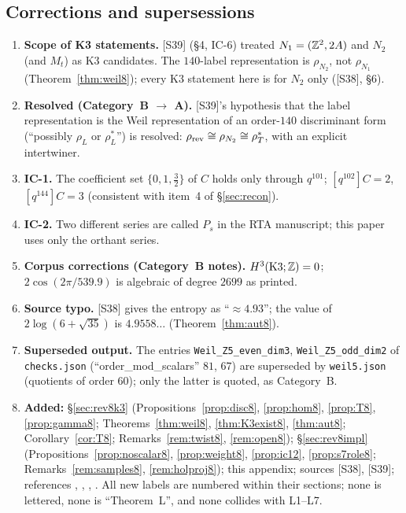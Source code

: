 \subsection{Corrections and supersessions}
\begin{enumerate}[label={R8.\arabic*},leftmargin=3em]
\item \textbf{Scope of K3 statements.} [S39] (\S4, IC-6) treated $N_1=(\mathbb{Z}^2,2A)$ and $N_2$ (and $M_t$) as K3 candidates. The $140$-label representation is $\rho_{N_2}$, not $\rho_{N_1}$ (Theorem~\ref{thm:weil8}); every K3 statement here is for $N_2$ only ([S38], \S6).
\item \textbf{Resolved (Category~B $\to$ A).} [S39]'s hypothesis that the label representation is the Weil representation of an order-$140$ discriminant form (``possibly $\rho_L$ or $\rho_L^*$'') is resolved: $\rho_{\rm rev}\cong\rho_{N_2}\cong\rho_T^*$, with an explicit intertwiner.
\item \textbf{IC-1.} The coefficient set $\{0,1,\tfrac32\}$ of $C$ holds only through $q^{101}$; $[q^{102}]C=2$, $[q^{144}]C=3$ (consistent with item~4 of \S\ref{sec:recon}).
\item \textbf{IC-2.} Two different series are called $P_s$ in the RTA manuscript; this paper uses only the orthant series.
\item \textbf{Corpus corrections (Category~B notes).} $H^3(\mathrm{K3};\mathbb{Z})=0$; $2\cos(2\pi/539.9)$ is algebraic of degree $2699$ as printed.
\item \textbf{Source typo.} [S38] gives the entropy as ``$\approx4.93$''; the value of $2\log(6+\sqrt{35})$ is $4.9558\ldots$ (Theorem~\ref{thm:aut8}).
\item \textbf{Superseded output.} The entries \texttt{Weil\_Z5\_even\_dim3}, \texttt{Weil\_Z5\_odd\_dim2} of \texttt{checks.json} (``order\_mod\_scalars'' $81$, $67$) are superseded by \texttt{weil5.json} (quotients of order $60$); only the latter is quoted, as Category~B.
\item \textbf{Added:} \S\ref{sec:rev8k3} (Propositions~\ref{prop:disc8}, \ref{prop:hom8}, \ref{prop:T8}, \ref{prop:gamma8}; Theorems~\ref{thm:weil8}, \ref{thm:K3exist8}, \ref{thm:aut8}; Corollary~\ref{cor:T8}; Remarks~\ref{rem:twist8}, \ref{rem:open8}); \S\ref{sec:rev8impl} (Propositions~\ref{prop:noscalar8}, \ref{prop:weight8}, \ref{prop:ic12}, \ref{prop:s7role8}; Remarks~\ref{rem:samples8}, \ref{rem:holproj8}); this appendix; sources [S38], [S39]; references \cite{Nikulin}, \cite{Morrison}, \cite{Huybrechts}, \cite{GY}. All new labels are numbered within their sections; none is lettered, none is ``Theorem~L'', and none collides with L1--L7.
\end{enumerate}
